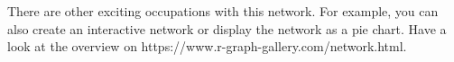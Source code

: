 \documentclass[11pt]{article}
\begin{document}
There are other exciting occupations with this network. For example, you
can also create an interactive network or display the network as a pie
chart. Have a look at the overview on
https://www.r-graph-gallery.com/network.html.

    \begin{tcolorbox}[breakable, size=fbox, boxrule=1pt, pad at break*=1mm,colback=cellbackground, colframe=cellborder]
\begin{Verbatim}[commandchars=\\\{\}]

\end{Verbatim}
\end{tcolorbox}


    
    
    
\end{document}
